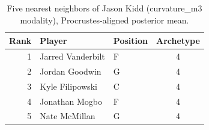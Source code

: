 \begin{table}[htbp]
  \centering\small
  \begin{tabular}{rllc}
    \toprule
    Rank & Player & Position & Archetype \\
    \midrule
    1 & Jarred Vanderbilt & F & 4 \\
    2 & Jordan Goodwin & G & 4 \\
    3 & Kyle Filipowski & C & 4 \\
    4 & Jonathan Mogbo & F & 4 \\
    5 & Nate McMillan & G & 4 \\
    \bottomrule
  \end{tabular}
  \caption{Five nearest neighbors of Jason Kidd (curvature_m3 modality), Procrustes-aligned posterior mean.}
  \label{tab:Jason_Kidd_neighbors_curvature_m3}
\end{table}

